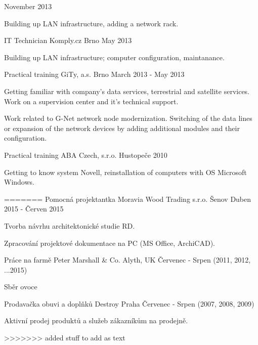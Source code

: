 \begin{cventries}
   {November 2013}
   {
    \begin{cvitems}
      \item {Building up LAN infrastructure, adding a network rack.}
    \end{cvitems}
   }
   \cventry
   {IT Technician}
   {Komply.cz}
   {Brno}
   {May 2013}
   {
    \begin{cvitems}
      \item {Building up LAN infrastructure; computer configuration, maintanance.}
    \end{cvitems}
   }
   \cventry
   {Practical training}
   {GiTy, a.s.}
   {Brno}
   {March 2013 - May 2013}
   {
    \begin{cvitems}
      \item {Getting familiar with company's data services, terrestrial and satellite services. Work on a supervision center and it's technical support.}
      \item {Work related to G-Net network node modernization. Switching of the data lines or expansion of the network devices by adding additional modules and their configuration.}
    \end{cvitems}
   }
   
   \cventry
   {Practical training}
   {ABA Czech, s.r.o.}
   {Hustopeče}
   {2010}
   {
    \begin{cvitems}
      \item {Getting to know system Novell, reinstallation of computers with OS Microsoft Windows.}
    \end{cvitems}
   }
=======
    {Pomocná projektantka} %
    {Moravia Wood Trading s.r.o.} %
    {Šenov} %
    {Duben 2015 - Červen 2015} %
    {
      \begin{cvitems} %
        \item {Tvorba návrhu architektonické studie RD.}
        \item {Zpracování projektové dokumentace na PC (MS Office, ArchiCAD).}
      \end{cvitems}
    }
   \cventry
   {Práce na farmě}
   {Peter Marshall \& Co.}
   {Alyth, UK}
   {Červenec - Srpen (2011, 2012, ...2015)}
   {
    \begin{cvitems}
      \item {Sběr ovoce}
    \end{cvitems}
   }
   \cventry
   {Prodavačka obuvi a doplňků}
   {Destroy}
   {Praha}
   {Červenec - Srpen (2007, 2008, 2009)}
   {
    \begin{cvitems}
      \item {Aktivní prodej produktů a služeb zákazníkům na prodejně.}
    \end{cvitems}
   }
  
>>>>>>> added stuff to add as text

\end{cventries}
